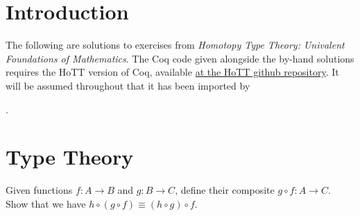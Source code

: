 \begin{coqdoccode}
\end{coqdoccode}


\section*{Introduction}


The following are solutions to exercises from
\textit{Homotopy Type Theory: Univalent Foundations of Mathematics}.  The Coq
code given alongside the by-hand solutions requires the HoTT version of Coq,
available \href{https://github.com/HoTT}{at the HoTT github repository}.  It
will be assumed throughout that it has been imported by \begin{coqdoccode}
\coqdocemptyline
\coqdocnoindent
{}  .\coqdoceol
\coqdocemptyline
\end{coqdoccode}
\tableofcontents


\section{Type Theory}



Given functions $f:A\to B$ and $g:B\to C$, define their composite $g
\circ f : A \to C$.  Show that we have $h \circ (g \circ f) \equiv (h
    \circ g) \circ f$.


